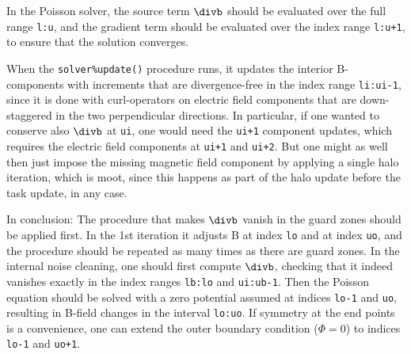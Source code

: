 \documentclass[paper=a4,fontsize=11pt]{scrartcl}
\numberwithin{equation}{section}		%
\numberwithin{figure}{section}			%
\numberwithin{table}{section}				%
\newcommand{\codecolor}{\color{Blue}}
\newcommand{\Code}[1]{{\codecolor\texttt{#1}}}
\begin{document}
In the Poisson solver, the source term $\divb$ should be evaluated over the full range \Code{l:u}, and the gradient term should be evaluated over the index range \Code{l:u+1}, to ensure that the solution converges.

When the \Code{solver\%update()} procedure runs, it updates the interior B-components with increments that are divergence-free in the index range \Code{li:ui-1}, since it is done with curl-operators on electric field components that are down-staggered in the two perpendicular directions.  In particular, if one wanted to conserve also $\divb$ at \Code{ui}, one would need the \Code{ui+1} component updates, which requires the electric field components at \Code{ui+1} and \Code{ui+2}.  But one might as well then just impose the missing magnetic field component by applying a single halo iteration, which is moot, since this happens as part of the halo update before the task update, in any case.

In conclusion:  The procedure that makes $\divb$ vanish in the guard zones should be applied first.  In the 1st iteration it adjusts B at index \Code{lo} and at index \Code{uo}, and the procedure should be repeated as many times as there are guard zones.  In the internal noise cleaning, one should first compute $\divb$, checking that it indeed vanishes exactly in the index ranges \Code{lb:lo} and \Code{ui:ub-1}.  Then the Poisson equation should be solved with a zero potential assumed at indices \Code{lo-1} and \Code{uo}, resulting in B-field changes in the interval \Code{lo:uo}.  If symmetry at the end points is a convenience, one can extend the outer boundary condition ($\Phi=0$) to indices \Code{lo-1} and \Code{uo+1}.

\end{document}
